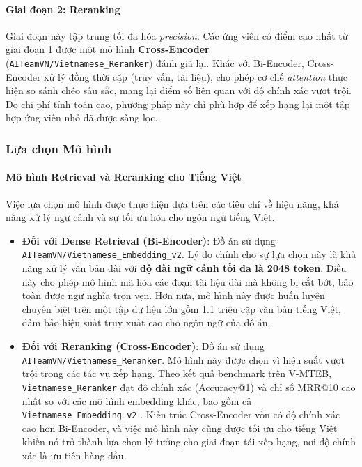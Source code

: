 \paragraph{Giai đoạn 2: Reranking}
Giai đoạn này tập trung tối đa hóa \textit{precision}. Các ứng viên có điểm cao nhất từ giai đoạn 1 được một mô hình \textbf{Cross-Encoder} (\texttt{AITeamVN/Vietnamese\_Reranker}) đánh giá lại. Khác với Bi-Encoder, Cross-Encoder xử lý đồng thời cặp (truy vấn, tài liệu), cho phép cơ chế \textit{attention} thực hiện so sánh chéo sâu sắc, mang lại điểm số liên quan với độ chính xác vượt trội. Do chi phí tính toán cao, phương pháp này chỉ phù hợp để xếp hạng lại một tập hợp ứng viên nhỏ đã được sàng lọc.

\subsubsection{Lựa chọn Mô hình}

\paragraph{Mô hình Retrieval và Reranking cho Tiếng Việt}
Việc lựa chọn mô hình được thực hiện dựa trên các tiêu chí về hiệu năng, khả năng xử lý ngữ cảnh và sự tối ưu hóa cho ngôn ngữ tiếng Việt.
\begin{itemize}
    \item \textbf{Đối với Dense Retrieval (Bi-Encoder)}: Đồ án sử dụng \texttt{AITeamVN/Vietnamese\_Embedding\_v2}. Lý do chính cho sự lựa chọn này là khả năng xử lý văn bản dài với \textbf{độ dài ngữ cảnh tối đa là 2048 token}. Điều này cho phép mô hình mã hóa các đoạn tài liệu dài mà không bị cắt bớt, bảo toàn được ngữ nghĩa trọn vẹn. Hơn nữa, mô hình này được huấn luyện chuyên biệt trên một tập dữ liệu lớn gồm 1.1 triệu cặp văn bản tiếng Việt, đảm bảo hiệu suất truy xuất cao cho ngôn ngữ của đồ án.
    \item \textbf{Đối với Reranking (Cross-Encoder)}: Đồ án sử dụng \texttt{AITeamVN/Vietnamese\_Reranker}. Mô hình này được chọn vì hiệu suất vượt trội trong các tác vụ xếp hạng. Theo kết quả benchmark trên V-MTEB, \texttt{Vietnamese\_Reranker} đạt độ chính xác (Accuracy@1) và chỉ số MRR@10 cao nhất so với các mô hình embedding khác, bao gồm cả \texttt{Vietnamese\_Embedding\_v2} \cite{vmteb_github}. Kiến trúc Cross-Encoder vốn có độ chính xác cao hơn Bi-Encoder, và việc mô hình này cũng được tối ưu cho tiếng Việt khiến nó trở thành lựa chọn lý tưởng cho giai đoạn tái xếp hạng, nơi độ chính xác là ưu tiên hàng đầu.
\end{itemize}

